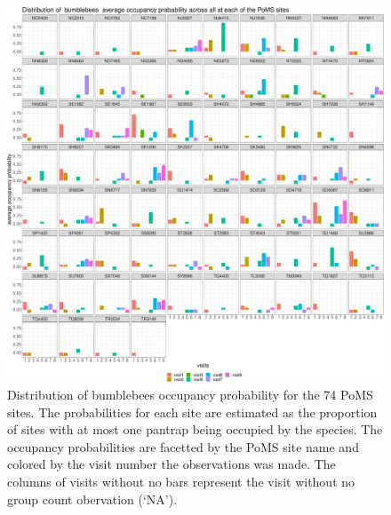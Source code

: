 \documentclass[
]{article}
\begin{document}
\begin{figure}

{\centering \includegraphics{SupplementaryInformationOne_files/figure-pdf/fig-bbSOPlot-1.pdf}

}

\caption{\label{fig-bbSOPlot}Distribution of bumblebees occupancy
probability for the 74 PoMS sites. The probabilities for each site are
estimated as the proportion of sites with at most one pantrap being
occupied by the species. The occupancy probabilities are facetted by the
PoMS site name and colored by the visit number the observations was
made. The columns of visits without no bars represent the visit without
no group count obervation (`NA').}

\end{figure}
\end{document}
